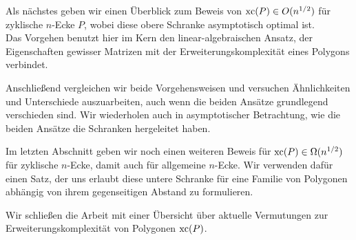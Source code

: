 Als nächstes geben wir einen Überblick zum Beweis von $\operatorname{xc}(P) \in O(n^{1/2})$ für zyklische $n$-Ecke $P$, wobei diese obere Schranke asymptotisch optimal ist.\\
Das Vorgehen benutzt hier im Kern den linear-algebraischen Ansatz, der Eigenschaften gewisser Matrizen mit der Erweiterungskomplexität eines Polygons verbindet.

Anschließend vergleichen wir beide Vorgehensweisen und versuchen Ähnlichkeiten und Unterschiede auszuarbeiten, auch wenn die beiden Ansätze grundlegend verschieden sind. Wir wiederholen auch in asymptotischer Betrachtung, wie die beiden Ansätze die Schranken hergeleitet haben.

Im letzten Abschnitt geben wir noch einen weiteren Beweis für $\operatorname{xc}(P) \in \Omega(n^{1/2})$ für zyklische $n$-Ecke, damit auch für allgemeine $n$-Ecke. Wir verwenden dafür einen Satz, der uns erlaubt diese untere Schranke für eine Familie von Polygonen abhängig von ihrem gegenseitigen Abstand zu formulieren.

Wir schließen die Arbeit mit einer Übersicht über aktuelle Vermutungen zur Erweiterungskomplexität von Polygonen $\operatorname{xc}(P)$.
